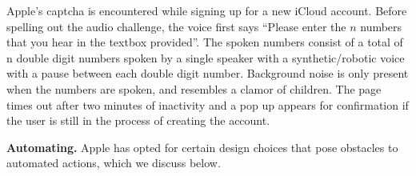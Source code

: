 Apple's captcha is encountered while signing up for a new iCloud account.
Before spelling out the audio challenge,
the voice first says ``Please enter the $n$ numbers that you hear in the textbox provided''. The 
spoken numbers consist of a total of n double digit numbers spoken by a single speaker with a synthetic/robotic voice with a pause between each double digit number.
Background noise is only present when the numbers are spoken,
and resembles a clamor of children.
The page times out after two minutes of inactivity and a pop up appears for confirmation if the user is 
still in the process of creating the account. 


\textbf{Automating.} Apple has opted for certain design choices that pose obstacles to automated actions,
which we discuss below.

